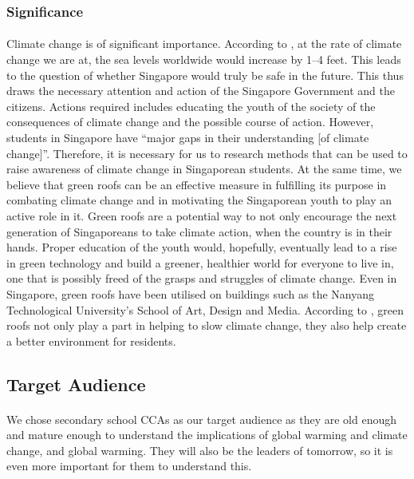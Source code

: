 \documentclass{article}
\begin{document}
\begin{multicols}{2}
  \subsubsection{Significance}
  \paragraph{} Climate change is of significant importance. According to
  \cite{nasa}, at the rate of climate change we are at, the sea levels
  worldwide would increase by 1--4 feet. This leads to the question of
  whether Singapore would truly be safe in the future. This thus draws
  the necessary attention and action of the Singapore Government and the
  citizens. Actions required includes educating the youth of the society
  of the consequences of climate change and the possible course of action.
  However, students in Singapore have ``major gaps in their understanding
  [of climate change]''\parencite{student_carbon_footprint}. Therefore,
  it is necessary for us to research methods that can be used to raise
  awareness of climate change in Singaporean students. At the same
  time, we believe that green roofs can be an effective measure in
  fulfilling its purpose in combating climate change and in motivating
  the Singaporean youth to play an active role in it. Green roofs are a
  potential way to not only encourage the next generation of Singaporeans
  to take climate action,  when the country is in their hands. Proper
  education of the youth would, hopefully, eventually lead to a rise in
  green technology and build a greener, healthier world for everyone
  to live in, one that is possibly freed of the grasps and struggles
  of climate change. Even in Singapore, green roofs have been utilised
  on buildings such as the Nanyang Technological University’s School
  of Art, Design and Media. According to \cite{greenbuild_advant1},
  green roofs not only play a part in helping to slow climate change,
  they also help create a better environment for residents.


  \subsection{Target Audience}
  \paragraph{} We chose secondary school CCAs as our target audience as
  they are old enough and mature enough to understand the implications
  of global warming and climate change, and global warming. They will
  also be the leaders of tomorrow, so it is even more important for them
  to understand this.



\end{multicols}
\end{document}
